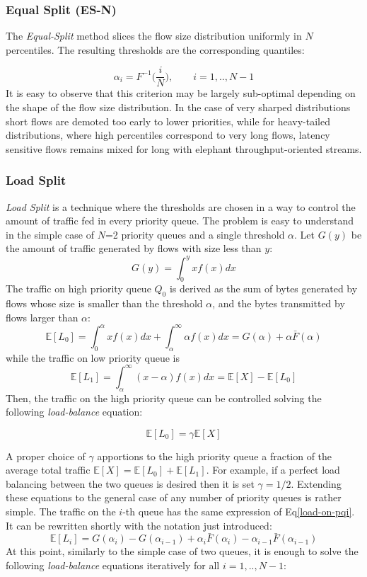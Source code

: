 \subsubsection{Equal Split (ES-N)}
The \textit{Equal-Split} method slices the flow size distribution uniformly in $N$ percentiles. The resulting thresholds are the corresponding quantiles:

\[
\alpha_{i} = F^{-1}\Big(\dfrac{i}{N}\Big), \qquad i=1,..,N-1
\]
It is easy to observe that this criterion may be largely sub-optimal depending on the shape of the flow size distribution. In the case of very sharped distributions short flows are demoted too early to lower priorities, while for heavy-tailed distributions, where high percentiles correspond to very long flows, latency sensitive flows remains mixed for long with elephant throughput-oriented streams.

\subsubsection{Load Split}
\emph{Load Split} is a technique where the thresholds are chosen in a way to control the amount of traffic fed in every priority queue.  The problem is easy to understand in the simple case of $N$=2 priority queues and a single threshold $\alpha$. Let $G(y)$ be the amount of traffic generated by flows with size less than $y$:
\[
G(y) = \int_{0}^y x f(x) dx
\]
The traffic on high priority queue $Q_0$ is derived as the sum of bytes generated by flows whose size is smaller than the threshold $\alpha$, and the bytes transmitted by flows larger than $\alpha$:
\[
\mathbb{E}[L_0] = \int_0^\alpha xf(x)dx+\int_\alpha^\infty \alpha f(x) dx=G(\alpha)+\alpha \bar{F}(\alpha)
\]
while the traffic on low priority queue is
\begin{equation*}
\mathbb{E}[L_1] =\int_\alpha^\infty (x-\alpha)f(x)dx=\mathbb{E}[X]-	\mathbb{E}[L_0]
\end{equation*}
Then, the traffic on the high priority queue can be controlled solving the following \textit{load-balance} equation:

\begin{equation}
\label{eq:main-gen}
\mathbb{E}[L_0] = \gamma \mathbb E[X] 
\end{equation}

A proper choice of $\gamma$ apportions to the high priority queue a fraction of the average total traffic $\mathbb{E}[X]  = \mathbb{E}[L_0] + \mathbb{E}[L_1]$. For example, if a perfect load balancing between the two queues is desired then it is set $\gamma = 1/2$.
Extending these equations to the general case of any number of priority queues is rather simple. The traffic on the $i$-th queue has the same expression of Eq\eqref{load-on-pqi}. It can be rewritten shortly with the notation just introduced:
\[
\mathbb{E}[L_i] = G(\alpha_i) - G(\alpha_{i-1}) + \alpha_i \bar{F}(\alpha_i) -\alpha_{i-1}\bar{F}(\alpha_{i-1})
\]
At this point, similarly to the simple case of two queues, it is enough to solve the following \emph{load-balance} equations iteratively for all $i = 1,..,N-1$:


